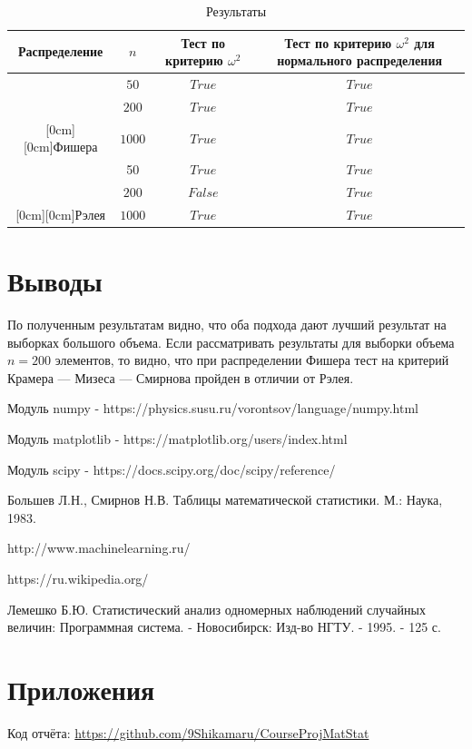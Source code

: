 \documentclass[a4]{article}
\begin{document}
\begin{table}[H]
\caption{Результаты}
\label{tab:my_label1}
\begin{center}
\vspace{5mm}
\begin{tabular}{|c|c|c|c|}
\hline
Распределение & $n$&Тест по критерию $\omega^2$ & Тест по критерию $\omega^2$ для нормального распределения \\
\hline
&$50$&	$True$&		$True$ \\
\cline{2-4}
&$200$&	$True$&		$True$ \\
\cline{2-4}
\raisebox{1.5ex}[0cm][0cm]{Фишера}&$1000$&	$True$&		$True$\\
\hline
&50&	$True$&		$True$ \\
\cline{2-4}
&$200$&	$False$&		$True$ \\
\cline{2-4}
\raisebox{1.5ex}[0cm][0cm]{Рэлея}&$1000$&	$True$&	$True$\\
\hline
\end{tabular}
\end{center}
\end{table}

\section{Выводы}

По полученным результатам видно, что оба подхода дают лучший результат на выборках большого объема. Если рассматривать результаты для выборки объема $n=200$ элементов, то видно, что при распределении Фишера тест на критерий Крамера — Мизеса — Смирнова пройден в отличии от Рэлея.

\begin{thebibliography}{}
      Модуль numpy  -  https://physics.susu.ru/vorontsov/language/numpy.html
    
    Модуль matplotlib - https://matplotlib.org/users/index.html
    
    Модуль scipy - https://docs.scipy.org/doc/scipy/reference/
    

Большев Л.Н., Смирнов Н.В. Таблицы математической статистики. М.: Наука, 1983.

http://www.machinelearning.ru/

https://ru.wikipedia.org/

Лемешко  Б.Ю.  Статистический  анализ  одномерных  наблюдений  случайных  величин: Программная система. - Новосибирск: Изд-во НГТУ. - 1995. - 125 с.

\end{thebibliography}

\section{Приложения}


Код отчёта:\; \url{https://github.com/9Shikamaru/CourseProjMatStat}
\end{document}
